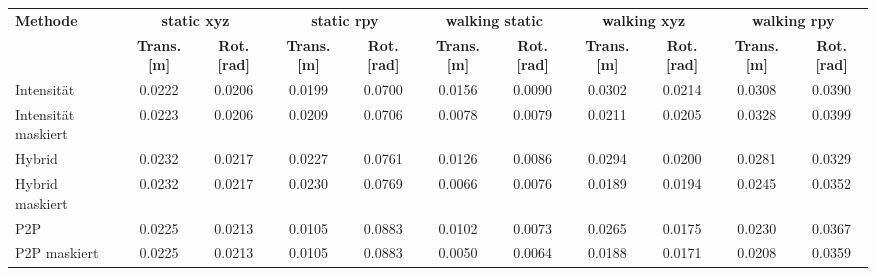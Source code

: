 \begin{tabular}{l*{10}{c}}
\toprule
    \multirow{2}{*}{\textbf{Methode}} & \multicolumn{2}{c}{\textbf{static xyz}} & \multicolumn{2}{c}{\textbf{static rpy}} & \multicolumn{2}{c}{\textbf{walking static}} & \multicolumn{2}{c}{\textbf{walking xyz}} & \multicolumn{2}{c}{\textbf{walking rpy}} \\
\cmidrule(lr){2-3}  \cmidrule(lr){4-5}  \cmidrule(lr){6-7}  \cmidrule(lr){8-9}  \cmidrule(lr){10-11}
    & \textbf{Trans. [m]} & \textbf{Rot. [rad]} & \textbf{Trans. [m]} & \textbf{Rot. [rad]} & \textbf{Trans. [m]} & \textbf{Rot. [rad]} & \textbf{Trans. [m]} & \textbf{Rot. [rad]} & \textbf{Trans. [m]} & \textbf{Rot. [rad]} \\
\midrule
Intensität  & 0.0222 & 0.0206 & 0.0199 & 0.0700 & 0.0156 & 0.0090 & 0.0302 & 0.0214 & 0.0308 & 0.0390 \\
Intensität maskiert & 0.0223 & 0.0206 & 0.0209 & 0.0706 & 0.0078 & 0.0079 & 0.0211 & 0.0205 & 0.0328 & 0.0399 \\
Hybrid  & 0.0232 & 0.0217 & 0.0227 & 0.0761 & 0.0126 & 0.0086 & 0.0294 & 0.0200 & 0.0281 & 0.0329 \\
Hybrid maskiert & 0.0232 & 0.0217 & 0.0230 & 0.0769 & 0.0066 & 0.0076 & 0.0189 & 0.0194 & 0.0245 & 0.0352 \\
P2P  & 0.0225 & 0.0213 & 0.0105 & 0.0883 & 0.0102 & 0.0073 & 0.0265 & 0.0175 & 0.0230 & 0.0367 \\
P2P maskiert & 0.0225 & 0.0213 & 0.0105 & 0.0883 & 0.0050 & 0.0064 & 0.0188 & 0.0171 & 0.0208 & 0.0359 \\
\bottomrule
\end{tabular}

